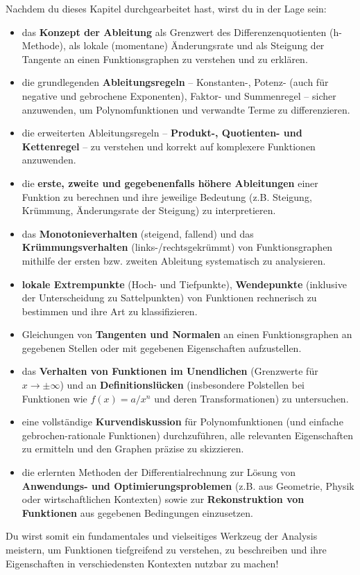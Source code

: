 \begin{tcolorbox}[colback=blue!5!white, colframe=blue!75!black, title=Was du in diesem Kapitel lernen wirst:]
Nachdem du dieses Kapitel durchgearbeitet hast, wirst du in der Lage sein:
\begin{itemize}[noitemsep, topsep=0pt, leftmargin=*, itemsep=2pt]
    \item das \textbf{Konzept der Ableitung} als Grenzwert des Differenzenquotienten (h-Methode), als lokale (momentane) Änderungsrate und als Steigung der Tangente an einen Funktionsgraphen zu verstehen und zu erklären.
    \item die grundlegenden \textbf{Ableitungsregeln} – Konstanten-, Potenz- (auch für negative und gebrochene Exponenten), Faktor- und Summenregel – sicher anzuwenden, um Polynomfunktionen und verwandte Terme zu differenzieren.
    \item die erweiterten Ableitungsregeln – \textbf{Produkt-, Quotienten- und Kettenregel} – zu verstehen und korrekt auf komplexere Funktionen anzuwenden.
    \item die \textbf{erste, zweite und gegebenenfalls höhere Ableitungen} einer Funktion zu berechnen und ihre jeweilige Bedeutung (z.B. Steigung, Krümmung, Änderungsrate der Steigung) zu interpretieren.
    \item das \textbf{Monotonieverhalten} (steigend, fallend) und das \textbf{Krümmungsverhalten} (links-/rechtsgekrümmt) von Funktionsgraphen mithilfe der ersten bzw. zweiten Ableitung systematisch zu analysieren.
    \item \textbf{lokale Extrempunkte} (Hoch- und Tiefpunkte), \textbf{Wendepunkte} (inklusive der Unterscheidung zu Sattelpunkten) von Funktionen rechnerisch zu bestimmen und ihre Art zu klassifizieren.
    \item Gleichungen von \textbf{Tangenten und Normalen} an einen Funktionsgraphen an gegebenen Stellen oder mit gegebenen Eigenschaften aufzustellen.
    \item das \textbf{Verhalten von Funktionen im Unendlichen} (Grenzwerte für $x \to \pm\infty$) und an \textbf{Definitionslücken} (insbesondere Polstellen bei Funktionen wie $f(x) = a/x^n$ und deren Transformationen) zu untersuchen.
    \item eine vollständige \textbf{Kurvendiskussion} für Polynomfunktionen (und einfache gebrochen-rationale Funktionen) durchzuführen, alle relevanten Eigenschaften zu ermitteln und den Graphen präzise zu skizzieren.
    \item die erlernten Methoden der Differentialrechnung zur Lösung von \textbf{Anwendungs- und Optimierungsproblemen} (z.B. aus Geometrie, Physik oder wirtschaftlichen Kontexten) sowie zur \textbf{Rekonstruktion von Funktionen} aus gegebenen Bedingungen einzusetzen.
\end{itemize}
Du wirst somit ein fundamentales und vielseitiges Werkzeug der Analysis meistern, um Funktionen tiefgreifend zu verstehen, zu beschreiben und ihre Eigenschaften in verschiedensten Kontexten nutzbar zu machen!
\end{tcolorbox}
\bigskip

